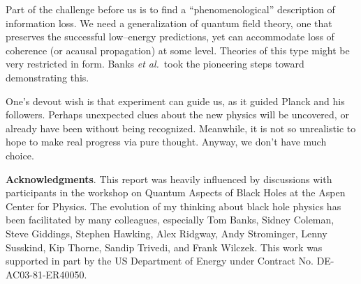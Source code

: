 Part of the challenge before us is to find a ``phenomenological'' description
of information loss.  We need a generalization of quantum field theory, one
that preserves the successful low--energy predictions, yet can accommodate loss
of coherence (or acausal propagation) at some level.\lref{}\lref{}\lref{}  Theories of this type might be very restricted in
form.  Banks {\it et al.}\BPS\ took the pioneering steps toward demonstrating
this.\lref{}

One's devout wish is that experiment can guide us, as it guided Planck and his
followers.  Perhaps unexpected clues about the new physics will be uncovered,
or already have been without being recognized.  Meanwhile, it is not so
unrealistic to hope to make real progress via pure thought.  Anyway, we don't
have much choice.

\bigskip
{\bf Acknowledgments}.  This report was heavily influenced by
discussions with participants in the  workshop on Quantum
Aspects of Black Holes at the Aspen Center for Physics.  The evolution
of my thinking about black hole physics has been
facilitated by many colleagues, especially Tom
Banks, Sidney Coleman, Steve Giddings, Stephen Hawking, Alex Ridgway, Andy
Strominger, Lenny Susskind, Kip Thorne, Sandip Trivedi, and Frank Wilczek.
This work was supported in part by the US Department of Energy under
Contract No. DE-AC03-81-ER40050.
\listrefs
\bye
